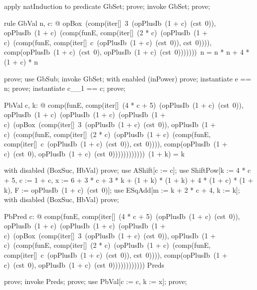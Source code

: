\documentclass{article}
\begin{document}
\begin{zproof}
apply natInduction to predicate \nat \subseteq GbSet;
prove;
invoke GbSet;
prove;
\end{zproof}

\begin{theorem}{rule GbVal}
  \forall n, c: \nat @ opBox~(comp(iter[\nat]~3~(opPlusIb~(1 + c)~(cst~0)), opPlusIb~(1 + c)~(comp(funE, comp(iter[\nat]~(2 * c)~(opPlusIb~(1 + c)~(comp(funE, comp(iter[\nat]~c~(opPlusIb~(1 + c)~(cst~0)), cst~0)))), comp(opPlusIb~(1 + c)~(cst~0), opPlusIb~(1 + c)~(cst~0)))))))~n = n * n + 4 * (1 + c) * n
\end{theorem}

\begin{zproof}
prove;
use GbSub;
invoke GbSet;
with enabled (inPower) prove;
instantiate e == n;
prove;
instantiate c\_\_1 == c;
prove;
\end{zproof}

\begin{theorem}{PbVal}
  \forall c, k: \nat @ comp(funE, comp(iter[\nat]~(4 * c + 5)~(opPlusIb~(1 + c)~(cst~0)), opPlusIb~(1 + c)~(opPlusIb~(1 + c)~(opPlusIb~(1 + c)~(opBox~(comp(iter[\nat]~3~(opPlusIb~(1 + c)~(cst~0)), opPlusIb~(1 + c)~(comp(funE, comp(iter[\nat]~(2 * c)~(opPlusIb~(1 + c)~(comp(funE, comp(iter[\nat]~c~(opPlusIb~(1 + c)~(cst~0)), cst~0)))), comp(opPlusIb~(1 + c)~(cst~0), opPlusIb~(1 + c)~(cst~0))))))))))))~(1 + k) = k
\end{theorem}

\begin{zproof}
with disabled (BoxSuc, HbVal) prove;
use AShift[c := c];
use ShiftPow[k := 4 * c + 5, c := 1 + c, x := 6 + 3 * c + 3 * k + (1 + k) * (1 + k) + 4 * (1 + c) * (1 + k), F := opPlusIb~(1 + c)~(cst~0)];
use ESqAdd[m := k + 2 * c + 4, k := k];
with disabled (BoxSuc, HbVal) prove;
\end{zproof}


\begin{theorem}{PbPred}
  \forall c: \nat @ comp(funE, comp(iter[\nat]~(4 * c + 5)~(opPlusIb~(1 + c)~(cst~0)), opPlusIb~(1 + c)~(opPlusIb~(1 + c)~(opPlusIb~(1 + c)~(opBox~(comp(iter[\nat]~3~(opPlusIb~(1 + c)~(cst~0)), opPlusIb~(1 + c)~(comp(funE, comp(iter[\nat]~(2 * c)~(opPlusIb~(1 + c)~(comp(funE, comp(iter[\nat]~c~(opPlusIb~(1 + c)~(cst~0)), cst~0)))), comp(opPlusIb~(1 + c)~(cst~0), opPlusIb~(1 + c)~(cst~0)))))))))))) \in Preds
\end{theorem}

\begin{zproof}
prove;
invoke Preds;
prove;
use PbVal[c := c, k := x];
prove;
\end{zproof}
\end{document}
